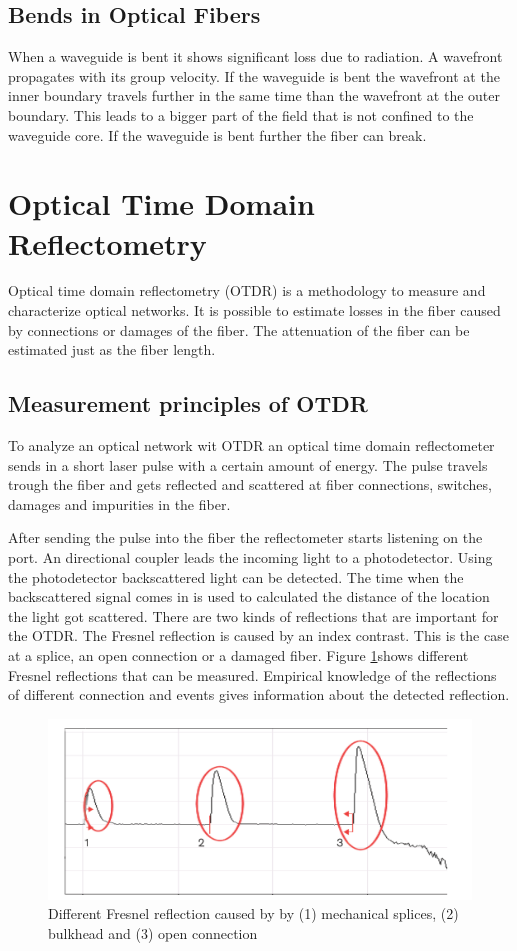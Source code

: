 \subsection{Bends in Optical Fibers}

When a waveguide is bent it shows significant loss due to radiation. A wavefront propagates with its group velocity. If the waveguide is bent the wavefront at the inner boundary travels further in the same time than the wavefront at the outer boundary. This leads to a bigger part of the field that is not confined to the waveguide core. If the waveguide is bent further the fiber can break.


\section{Optical Time Domain Reflectometry}
Optical time domain reflectometry (OTDR) is a methodology to measure and characterize optical networks. It is possible to estimate losses in the fiber caused by connections or damages of the fiber. The attenuation of the fiber can be estimated just as the fiber length.

\subsection{Measurement principles of OTDR}
To analyze an optical network wit OTDR an optical time domain reflectometer sends in a short laser pulse with a certain amount of energy. The pulse travels trough the fiber and gets reflected and scattered at fiber connections, switches, damages and impurities in the fiber. 

After sending the pulse into the fiber the reflectometer starts listening on the port. An directional coupler leads the incoming light to a photodetector. Using the photodetector backscattered light can be detected. The time when the backscattered signal comes in is used to calculated the distance of the location the light got scattered.
There are two kinds of reflections that are important for the OTDR.
The Fresnel reflection is caused by an index contrast. This is the case at a splice, an open connection or a damaged fiber. Figure \ref{fig:fresnel}\footnotemark[1] shows different Fresnel reflections that can be measured. Empirical knowledge of the reflections of different connection and events gives information about the detected reflection.
 

\begin{figure}%
\centering
\includegraphics[width=.6\columnwidth]{Grafiken/fresnel.png}%
\caption{Different Fresnel reflection caused by by (1) mechanical splices, (2) bulkhead and (3) open connection}%
\label{fig:fresnel}%
\end{figure}

